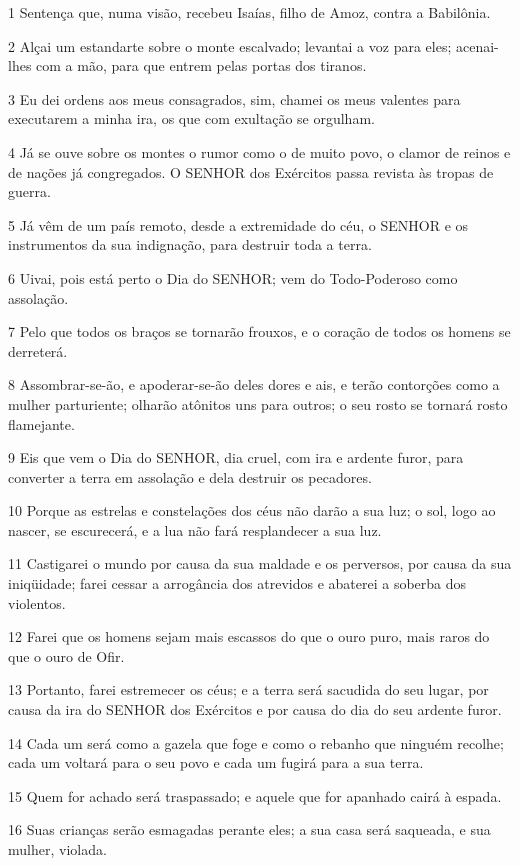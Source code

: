 \par 1 Sentença que, numa visão, recebeu Isaías, filho de Amoz, contra a Babilônia.
\par 2 Alçai um estandarte sobre o monte escalvado; levantai a voz para eles; acenai-lhes com a mão, para que entrem pelas portas dos tiranos.
\par 3 Eu dei ordens aos meus consagrados, sim, chamei os meus valentes para executarem a minha ira, os que com exultação se orgulham.
\par 4 Já se ouve sobre os montes o rumor como o de muito povo, o clamor de reinos e de nações já congregados. O SENHOR dos Exércitos passa revista às tropas de guerra.
\par 5 Já vêm de um país remoto, desde a extremidade do céu, o SENHOR e os instrumentos da sua indignação, para destruir toda a terra.
\par 6 Uivai, pois está perto o Dia do SENHOR; vem do Todo-Poderoso como assolação.
\par 7 Pelo que todos os braços se tornarão frouxos, e o coração de todos os homens se derreterá.
\par 8 Assombrar-se-ão, e apoderar-se-ão deles dores e ais, e terão contorções como a mulher parturiente; olharão atônitos uns para outros; o seu rosto se tornará rosto flamejante.
\par 9 Eis que vem o Dia do SENHOR, dia cruel, com ira e ardente furor, para converter a terra em assolação e dela destruir os pecadores.
\par 10 Porque as estrelas e constelações dos céus não darão a sua luz; o sol, logo ao nascer, se escurecerá, e a lua não fará resplandecer a sua luz.
\par 11 Castigarei o mundo por causa da sua maldade e os perversos, por causa da sua iniqüidade; farei cessar a arrogância dos atrevidos e abaterei a soberba dos violentos.
\par 12 Farei que os homens sejam mais escassos do que o ouro puro, mais raros do que o ouro de Ofir.
\par 13 Portanto, farei estremecer os céus; e a terra será sacudida do seu lugar, por causa da ira do SENHOR dos Exércitos e por causa do dia do seu ardente furor.
\par 14 Cada um será como a gazela que foge e como o rebanho que ninguém recolhe; cada um voltará para o seu povo e cada um fugirá para a sua terra.
\par 15 Quem for achado será traspassado; e aquele que for apanhado cairá à espada.
\par 16 Suas crianças serão esmagadas perante eles; a sua casa será saqueada, e sua mulher, violada.
